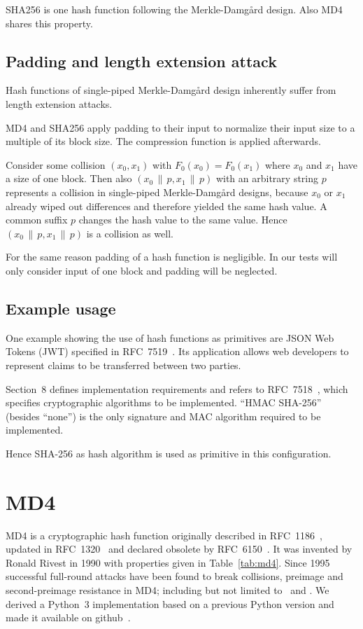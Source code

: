 SHA256 is one hash function following the Merkle-Damg\aa{}rd design.
Also MD4 shares this property.

\subsection{Padding and length extension attack}
\label{sec:hash-length-ext-attack}
%
Hash functions of single-piped Merkle-Damg\aa{}rd design inherently suffer
from length extension attacks.

MD4 and SHA256 apply padding to their input to normalize their input size
to a multiple of its block size. The compression function is applied afterwards.

Consider some collision $(x_0, x_1)$ with $F_0(x_0) = F_0(x_1)$ where $x_0$ and
$x_1$ have a size of one block. Then also $(x_0 \,\|\, p, x_1 \,\|\, p)$ with an arbitrary
string $p$ represents a collision in single-piped Merkle-Damg\aa{}rd designs,
because $x_0$ or $x_1$ already wiped out differences and therefore yielded
the same hash value. A common suffix $p$ changes the hash value to the same value.
Hence $(x_0 \,\|\, p, x_1 \,\|\, p)$ is a collision as well.

For the same reason padding of a hash function is negligible. In our tests will
only consider input of one block and padding will be neglected.

\subsection{Example usage}
\label{sec:hash-usage}

One example showing the use of hash functions as primitives are JSON Web Tokens (JWT)
specified in RFC~7519~\cite{rfc7519}. Its application allows web developers to
represent claims to be transferred between two parties.

Section~8 defines implementation requirements
and refers to RFC~7518~\cite{rfc7518}, which specifies cryptographic algorithms to
be implemented. \enquote{HMAC SHA-256} (besides \enquote{none}) is the only signature
and MAC algorithm required to be implemented.

Hence SHA-256 as hash algorithm is used as primitive in this configuration.

\section{MD4}
\label{sec:dc-md4}
%
MD4 is a cryptographic hash function originally described in RFC~1186~\cite{rfc1186},
updated in RFC~1320~\cite{rfc1320} and declared obsolete by RFC~6150~\cite{rfc6150}. It was
invented by Ronald Rivest in 1990 with properties given in Table~\ref{tab:md4}.
Since 1995~\cite{Dobbertin1998} successful full-round attacks have been found to break collisions,
preimage and second-preimage resistance in MD4; including but not limited to~\cite{md4-2007} and
\cite{cryptoeprint:2005:151}. We derived a Python~3 implementation based on
a previous Python version and made it available on github~\cite{md4-py3k}.

